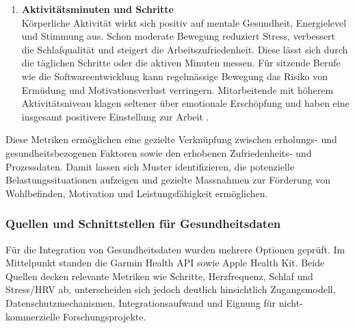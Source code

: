 \documentclass[12pt,a4paper]{report}
\begin{document}
\begin{enumerate}
  \item \textbf{Aktivitätsminuten und Schritte}\\
        Körperliche Aktivität wirkt sich positiv auf mentale Gesundheit, Energielevel und Stimmung aus. Schon moderate Bewegung
        reduziert Stress, verbessert die Schlafqualität und steigert die Arbeitszufriedenheit. Diese lässt sich durch die täglichen
        Schritte oder die aktiven Minuten messen. Für sitzende Berufe wie die Softwareentwicklung kann regelmässige Bewegung das
        Risiko von Ermüdung und Motivationsverlust verringern. Mitarbeitende mit höherem Aktivitätsniveau klagen seltener über
        emotionale Erschöpfung und haben eine insgesamt positivere Einstellung zur Arbeit \cite{dallmeyer_activity_2023}.
\end{enumerate}

Diese Metriken ermöglichen eine gezielte Verknüpfung zwischen erholungs- und gesundheitsbezogenen Faktoren sowie den erhobenen
Zufriedenheits- und Prozessdaten. Damit lassen sich Muster identifizieren, die potenzielle Belastungssituationen aufzeigen und 
gezielte Massnahmen zur Förderung von Wohlbefinden, Motivation und Leistungsfähigkeit ermöglichen.

\subsubsection{Quellen und Schnittstellen für Gesundheitsdaten}

Für die Integration von Gesundheitsdaten wurden mehrere Optionen geprüft. Im Mittelpunkt standen die Garmin Health API sowie Apple
Health Kit. Beide Quellen decken relevante Metriken wie Schritte, Herzfrequenz, Schlaf und Stress/HRV ab, unterscheiden sich jedoch
deutlich hinsichtlich Zugangsmodell, Datenschutzmechanismen, Integrationsaufwand und Eignung für nicht-kommerzielle 
Forschungsprojekte.
\end{document}
